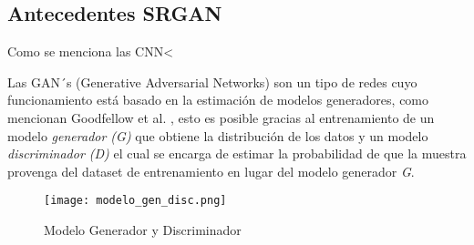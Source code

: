 \subsection{Antecedentes SRGAN}


Como se menciona las CNN<

Las GAN´s (Generative Adversarial Networks) son un tipo de redes cuyo funcionamiento está basado
en la estimación de modelos generadores, como mencionan Goodfellow et al. \cite{GANs}, esto es 
posible gracias al entrenamiento de un modelo \emph{generador (G)} que obtiene la distribución de 
los datos y un modelo \emph{discriminador (D)} el cual se encarga de estimar la probabilidad 
de que la muestra provenga del dataset de entrenamiento en lugar del modelo generador \emph{G}.

\begin{figure}[H]
    \begin{center}
      \texttt{[image: modelo\_gen\_disc.png]}
      \caption{Modelo Generador y Discriminador}
      \label{Alex1}
    \end{center}
    \end{figure}